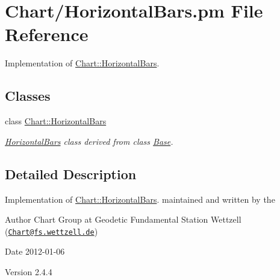 \hypertarget{HorizontalBars_8pm}{
\section{Chart/HorizontalBars.pm File Reference}
\label{HorizontalBars_8pm}
}


Implementation of \hyperlink{classChart_1_1HorizontalBars}{Chart::HorizontalBars}.  


\subsection*{Classes}
\begin{DoxyCompactItemize}
\item 
class \hyperlink{classChart_1_1HorizontalBars}{Chart::HorizontalBars}
\begin{DoxyCompactList}\small\item\em \hyperlink{classChart_1_1HorizontalBars}{HorizontalBars} class derived from class \hyperlink{classChart_1_1Base}{Base}. \item\end{DoxyCompactList}\end{DoxyCompactItemize}


\subsection{Detailed Description}
Implementation of \hyperlink{classChart_1_1HorizontalBars}{Chart::HorizontalBars}. maintained and written by the \begin{DoxyAuthor}{Author}
Chart Group at Geodetic Fundamental Station Wettzell (\href{mailto:Chart@fs.wettzell.de}{\tt Chart@fs.wettzell.de}) 
\end{DoxyAuthor}
\begin{DoxyDate}{Date}
2012-\/01-\/06 
\end{DoxyDate}
\begin{DoxyVersion}{Version}
2.4.4 
\end{DoxyVersion}
